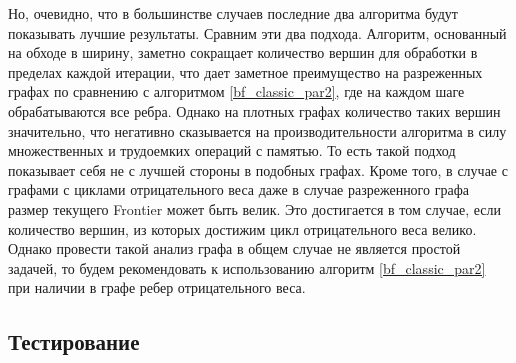 Но, очевидно, что в большинстве случаев последние два алгоритма будут показывать лучшие результаты. Сравним эти два подхода. Алгоритм, основанный на обходе в ширину, заметно сокращает количество вершин для обработки в пределах каждой итерации, что дает заметное преимущество на разреженных графах по сравнению с алгоритмом \ref{bf_classic_par2}, где на каждом шаге обрабатываются все ребра. Однако на плотных графах количество таких вершин значительно, что негативно сказывается на производительности алгоритма в силу множественных и трудоемких операций с памятью. То есть такой подход показывает себя не с лучшей стороны в подобных графах. Кроме того, в случае с графами с циклами отрицательного веса даже в случае разреженного графа размер текущего Frontier может быть велик. Это достигается в том случае, если количество вершин, из которых достижим цикл отрицательного веса велико. Однако провести такой анализ графа в общем случае не является простой задачей, то будем рекомендовать к использованию алгоритм \ref{bf_classic_par2} при наличии в графе ребер отрицательного веса.

\FloatBarrier
\subsection{Тестирование}



